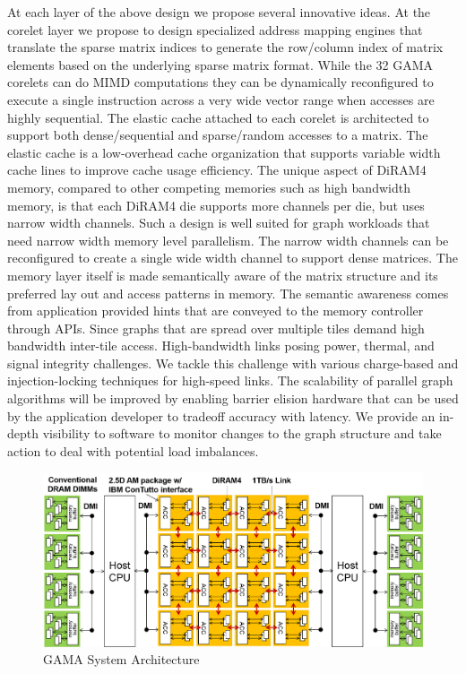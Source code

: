At each layer of the above design we propose several innovative ideas. At the corelet layer we propose to design specialized address mapping engines that translate the sparse matrix indices to generate the row/column index of matrix elements based on the underlying sparse matrix format. While the 32 GAMA corelets can do MIMD computations they can  be dynamically reconfigured to execute a single instruction across a very wide vector range when accesses are highly sequential.  The elastic  cache attached to each corelet is architected to support both dense/sequential and sparse/random accesses to a matrix. The elastic cache is a low-overhead cache organization that supports variable width cache lines to improve cache usage efficiency.  
 The unique aspect of DiRAM4 memory, compared to other competing memories such as high bandwidth memory, is that each DiRAM4 die supports more channels per die, but uses narrow width channels. Such a design is well suited for graph workloads that need narrow width memory level parallelism. The narrow width channels can be reconfigured to create a single wide width channel to support dense matrices. The memory layer itself is made semantically aware of the matrix structure and its preferred lay out and access patterns in memory. The semantic awareness comes from application provided hints that are conveyed to the memory controller through APIs. Since graphs that are spread over multiple tiles demand high bandwidth inter-tile access. High-bandwidth links  posing power, thermal, and signal integrity challenges.  We tackle this challenge with various charge-based and injection-locking techniques for high-speed links. The scalability of parallel graph algorithms will be improved by enabling barrier elision hardware that can be used by the application developer to tradeoff accuracy with latency. We provide an in-depth visibility to software to monitor changes to the graph structure and take action to deal with potential load imbalances.  
\begin{figure}
\center
\includegraphics[width=1.0\linewidth]{fig/arch.png}
\caption{GAMA System Architecture}
\label{fig:arch}
\end{figure}


